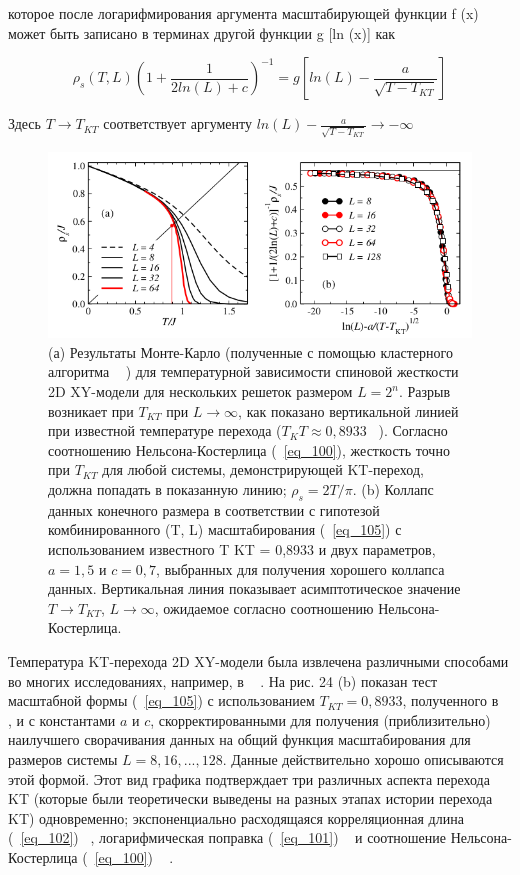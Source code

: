 \documentclass[11pt]{article}
\begin{document}
которое после логарифмирования аргумента масштабирующей функции f (x) может быть записано в терминах другой функции g [ln (x)] как

\begin{equation}
\rho_s(T,L)(1+\frac{1}{2ln(L)+c})^{-1} = g[ln(L)-\frac{a}{\sqrt{T-T_{KT}}}]
\label{eq_104}
\end{equation}

Здесь $T \to T_{KT}$ соответствует аргументу $ln(L)-\frac{a}{\sqrt{T-T_{KT}}} \to -\infty$

\begin{figure}[htp]
\centering
\includegraphics[scale=0.5]{fig24}
\caption{(а) Результаты Монте-Карло (полученные с помощью кластерного алгоритма ~\cite{prl_62_361} ) для температурной зависимости спиновой жесткости 2D XY-модели для нескольких решеток размером $L = 2^n$. Разрыв возникает при $T_{KT}$ при $L \to \infty$, как показано вертикальной линией при известной температуре перехода ($T_ KT \approx 0,8933$ ~\cite{prb_65_184405}). Согласно соотношению Нельсона-Костерлица (~\ref{eq_100}), жесткость точно при $T_{KT}$ для любой системы, демонстрирующей KT-переход, должна попадать в показанную линию; $\rho_s = 2T / \pi$. (b) Коллапс данных конечного размера в соответствии с гипотезой комбинированного (T, L) масштабирования (~\ref{eq_105}) с использованием известного T KT = 0,8933 и двух параметров, $a = 1,5$ и $c = 0,7$, выбранных для получения хорошего коллапса данных. Вертикальная линия показывает асимптотическое значение $T \to T_{KT}$, $L \to \infty $, ожидаемое согласно соотношению Нельсона-Костерлица.}
\label{}
\end{figure}

Температура KT-перехода 2D XY-модели была извлечена различными способами во многих исследованиях, например, в ~\cite{prb_49_12071, prb_65_184405} . На рис. 24 (b) показан тест масштабной формы (~\ref{eq_105}) с использованием $T_{KT} = 0,8933$, полученного в ~\cite{prb_65_184405} , и с константами $a$ и $c$, скорректированными для получения (приблизительно) наилучшего сворачивания данных на общий функция масштабирования для размеров системы $L = 8, 16,. . ., 128$. Данные действительно хорошо описываются этой формой. Этот вид графика подтверждает три различных аспекта перехода KT (которые были теоретически выведены на разных этапах истории перехода KT) одновременно; экспоненциально расходящаяся корреляционная длина (~\ref{eq_102}) ~\cite{phys_6_1181, phys_7_1046}, логарифмическая поправка (~\ref{eq_101}) ~\cite{prb_37_5986} и соотношение Нельсона-Костерлица (~\ref{eq_100}) ~\cite{prb_39_1201} .
\end{document}
